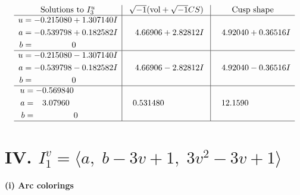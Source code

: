 \documentclass[1p]{elsarticle_modified}
\theoremstyle{definition}
\newcommand{\I}{\sqrt{-1}}
\begin{document}
$$\begin{array}{c|c|c}  
\text{Solutions to }I^u_{3}& \I (\text{vol} + \sqrt{-1}CS) & \text{Cusp shape}\\
 \hline 
\begin{aligned}
u &= -0.215080 + 1.307140 I \\
a &= -0.539798 + 0.182582 I \\
b &= \phantom{-0.000000 } 0\end{aligned}
 & \phantom{-}4.66906 + 2.82812 I & \phantom{-}4.92040 + 0.36516 I \\ \hline\begin{aligned}
u &= -0.215080 - 1.307140 I \\
a &= -0.539798 - 0.182582 I \\
b &= \phantom{-0.000000 } 0\end{aligned}
 & \phantom{-}4.66906 - 2.82812 I & \phantom{-}4.92040 - 0.36516 I \\ \hline\begin{aligned}
u &= -0.569840\phantom{ +0.000000I} \\
a &= \phantom{-}3.07960\phantom{ +0.000000I} \\
b &= \phantom{-0.000000 } 0\end{aligned}
 & \phantom{-}0.531480\phantom{ +0.000000I} & \phantom{-}12.1590\phantom{ +0.000000I}\\
 \hline 
 \end{array}$$\newpage\newpage\renewcommand{\arraystretch}{1}
\centering \section*{IV. $I^v_{1}= \langle a,\;b-3 v+1,\;3 v^2-3 v+1 \rangle$}
\flushleft \textbf{(i) Arc colorings}\\
\end{document}
